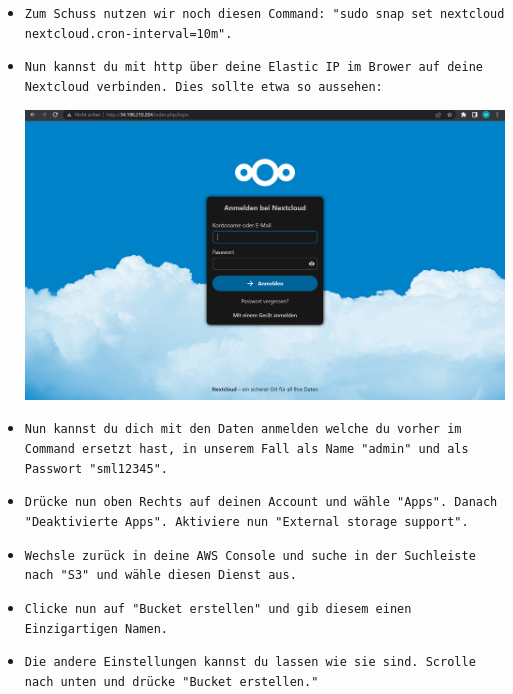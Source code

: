 \documentclass{article}
\begin{document}
\begin{itemize}
\item \texttt{Zum Schuss nutzen wir noch diesen Command: "sudo snap set nextcloud nextcloud.cron-interval=10m".} \\

\item \texttt{Nun kannst du mit http über deine Elastic IP im Brower auf deine Nextcloud verbinden. Dies sollte etwa so aussehen: 
} \\

\begin{center}
    \includegraphics[width=13cm]{images/nextcloud_4.png}
\end{center}

\clearpage

\item \texttt{Nun kannst du dich mit den Daten anmelden welche du vorher im Command ersetzt hast, in unserem Fall als Name "admin" und als Passwort "sml12345".} \\

\item \texttt{Drücke nun oben Rechts auf deinen Account und wähle "Apps". Danach "Deaktivierte Apps". Aktiviere nun "External storage support".} \\

\item \texttt{Wechsle zurück in deine AWS Console und suche in der Suchleiste nach "S3" und wähle diesen Dienst aus.} \\

\item \texttt{Clicke nun auf "Bucket erstellen" und gib diesem einen Einzigartigen Namen.} \\

\item \texttt{Die andere Einstellungen kannst du lassen wie sie sind. Scrolle nach unten und drücke "Bucket erstellen."} \\


\end{itemize}
\end{document}
